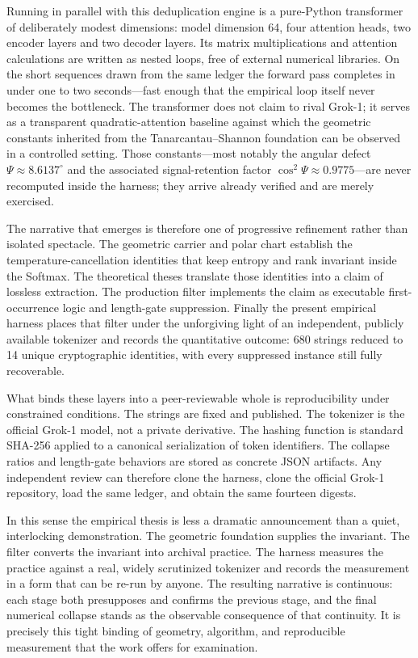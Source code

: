 Running in parallel with this deduplication engine is a pure-Python transformer of deliberately modest dimensions: model dimension 64, four attention heads, two encoder layers and two decoder layers. Its matrix multiplications and attention calculations are written as nested loops, free of external numerical libraries. On the short sequences drawn from the same ledger the forward pass completes in under one to two seconds—fast enough that the empirical loop itself never becomes the bottleneck. The transformer does not claim to rival Grok-1; it serves as a transparent quadratic-attention baseline against which the geometric constants inherited from the Tanarcantau–Shannon foundation can be observed in a controlled setting. Those constants—most notably the angular defect \(\Psi \approx 8.6137^\circ\) and the associated signal-retention factor \(\cos^2\Psi \approx 0.9775\)—are never recomputed inside the harness; they arrive already verified and are merely exercised.  

The narrative that emerges is therefore one of progressive refinement rather than isolated spectacle. The geometric carrier and polar chart establish the temperature-cancellation identities that keep entropy and rank invariant inside the Softmax. The theoretical theses translate those identities into a claim of lossless extraction. The production filter implements the claim as executable first-occurrence logic and length-gate suppression. Finally the present empirical harness places that filter under the unforgiving light of an independent, publicly available tokenizer and records the quantitative outcome: 680 strings reduced to 14 unique cryptographic identities, with every suppressed instance still fully recoverable. 

What binds these layers into a peer-reviewable whole is reproducibility under constrained conditions. The strings are fixed and published. The tokenizer is the official Grok-1 model, not a private derivative. The hashing function is standard SHA-256 applied to a canonical serialization of token identifiers. The collapse ratios and length-gate behaviors are stored as concrete JSON artifacts. Any independent review can therefore clone the harness, clone the official Grok-1 repository, load the same ledger, and obtain the same fourteen digests.

In this sense the empirical thesis is less a dramatic announcement than a quiet, interlocking demonstration. The geometric foundation supplies the invariant. The filter converts the invariant into archival practice. The harness measures the practice against a real, widely scrutinized tokenizer and records the measurement in a form that can be re-run by anyone. The resulting narrative is continuous: each stage both presupposes and confirms the previous stage, and the final numerical collapse stands as the observable consequence of that continuity. It is precisely this tight binding of geometry, algorithm, and reproducible measurement that the work offers for examination.

